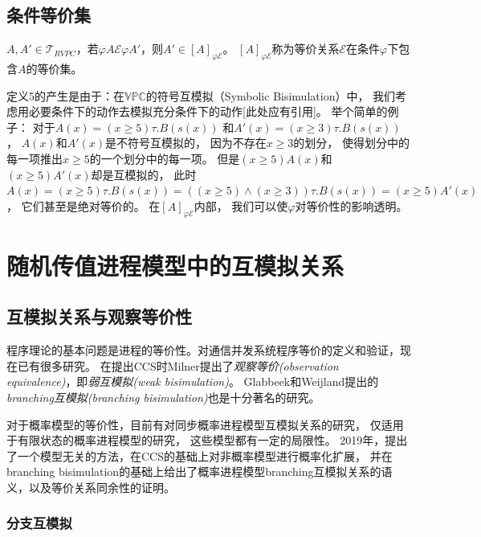 \subsection{条件等价集}
 \begin{definition}
   $A,A'\in \mathcal{T}_{RVPC}$，若$\varphi A \mathcal{E} \varphi A'$，则$A'\in [A]_{\varphi \mathcal{E}}$。
   $[A]_{\varphi \mathcal{E}}$称为等价关系$\mathcal{E}$在条件$\varphi$下包含$A$的等价集。  
 \end{definition} 
 定义5的产生是由于：在$\mathbb{VPC}$的符号互模拟（Symbolic Bisimulation）中，
 我们考虑用必要条件下的动作去模拟充分条件下的动作[此处应有引用]。
 举个简单的例子：
 对于$A(x)=(x\geq 5)\tau.B(s(x))$
 和$A'(x)=(x\geq 3)\tau.B(s(x))$，
 $A(x)$和$A'(x)$是不符号互模拟的，
 因为不存在$x\geq 3$的划分，
 使得划分中的每一项推出$x\geq 5$的一个划分中的每一项。
 但是$(x\geq 5) A(x)$和$(x\geq 5) A'(x)$却是互模拟的，
 此时$A(x)=(x\geq 5)\tau.B(s(x)) = ((x\geq 5)\wedge (x\geq 3))\tau.B(s(x)) = (x\geq 5)A'(x)$，
 它们甚至是绝对等价的。
 在$[A]_{\varphi \mathcal{E}}$内部，
 我们可以使$\varphi$对等价性的影响透明。

\section{随机传值进程模型中的互模拟关系}

\subsection{互模拟关系与观察等价性}

   程序理论的基本问题是进程的等价性。对通信并发系统程序等价的定义和验证，现在已有很多研究。
   在提出CCS时Milner提出了\textit{观察等价(observation equivalence)}，即\textit{弱互模拟(weak bisimulation)}\cite{2}。
   Glabbeek和Weijland提出的\textit{branching互模拟(branching bisimulation)}\cite{6}也是十分著名的研究。

   对于概率模型的等价性，目前有对同步概率进程模型互模拟关系的研究\cite{13}，
   仅适用于有限状态的概率进程模型的研究\cite{14,15}，
   这些模型都有一定的局限性。
   2019年，\cite{7}提出了一个模型无关的方法，在CCS的基础上对非概率模型进行概率化扩展，
   并在branching bisimulation\cite{6}的基础上给出了概率进程模型branching互模拟关系的语义，以及等价关系同余性的证明。

   \subsubsection{分支互模拟}

